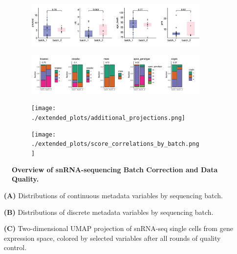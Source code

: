 \begin{figure}[H]
    \begin{subfigure}[t]{\textwidth}
        \caption{}
        \includegraphics[width=\textwidth]{./extended_plots/seq_batch_cont.png}        
    \end{subfigure}
    \begin{subfigure}[t]{\textwidth}
        \caption{}
        \includegraphics[width=\textwidth]{./extended_plots/seq_batch_cat.png}        
    \end{subfigure}  
    \begin{subfigure}[t]{\textwidth}
        \caption{}
        \texttt{[image: ./extended\_plots/additional\_projections.png]}        
    \end{subfigure}   
    \begin{subfigure}[t]{\textwidth}
        \caption{}
        \texttt{[image: ./extended\_plots/score\_correlations\_by\_batch.png]}        
    \end{subfigure}   
    \caption{
        \textbf{Overview of snRNA-sequencing Batch Correction and Data Quality.}\\
    }
    \label{fig:snRNA_batch_quality}
\end{figure}
\begin{itemize}
    \item[\textbf{(A)}] Distributions of continuous metadata variables by sequencing batch. 
    \item[\textbf{(B)}] Distributions of discrete metadata variables by sequencing batch. 
    \item[\textbf{(C)}] Two-dimensional UMAP projection of snRNA-seq single cells from gene expression space, colored by selected variables after all rounds of quality control. 
\end{itemize}